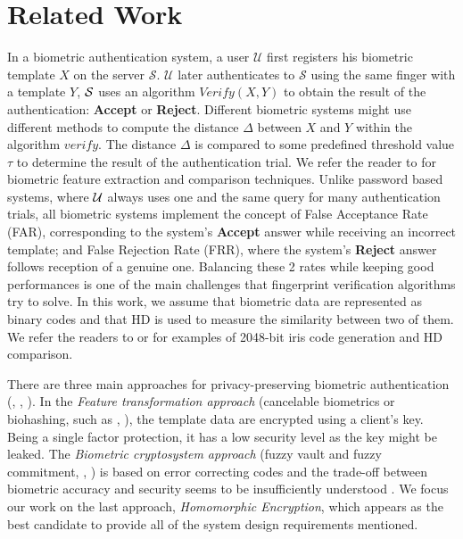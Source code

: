 \section{Related Work}
\label{sec:iscRelatedWor}
In a biometric authentication system, a user $\mathcal{U}$ first registers his
biometric template $X$ on the server $\mathcal{S}$. $\mathcal{U}$ later
authenticates to $\mathcal{S}$ using the same finger with a template $Y$,
$\mathcal{S}$ uses an algorithm $Verify(X,Y)$ to obtain the result of the
authentication: \textbf{Accept} or \textbf{Reject}. Different biometric systems
might use different methods to compute the distance $\Delta$ between $X$ and $Y$
within the algorithm $verify$. The distance $\Delta$ is compared to some
predefined threshold value $\tau$ to determine the result of the authentication
trial. We refer the reader to \cite{jain2007handbook} for biometric feature
extraction and comparison techniques. Unlike password based systems, where
$\mathcal{U}$ always uses one and the same query for many authentication trials,
all biometric systems implement the concept of False Acceptance Rate (FAR),
corresponding to the system's \textbf{Accept} answer while receiving an
incorrect template; and False Rejection Rate (FRR), where the system's
\textbf{Reject} answer follows reception of a genuine one.  Balancing these 2
rates while keeping good performances is one of the main challenges that
fingerprint verification algorithms \cite{FVConGoi2:online} try to solve. In
this work, we assume that biometric data are represented as binary codes and
that HD is used to measure the similarity between two of them. We refer the
readers to \cite{daugman2003importance} or \cite{FujitsuD7:online} for examples
of 2048-bit iris code generation and HD comparison.

There are three main approaches for privacy-preserving biometric authentication
(\cite{jain201650}, \cite{belguechi2011overview}, \cite{jain2008biometric}). In
the \emph{Feature transformation approach} (cancelable biometrics or biohashing,
such as \cite{teoh2008cancellable}, \cite{cappelli2010minutia}), the template
data are encrypted using a client's key. Being a single factor protection, it
has a low security level as the key might be leaked. The \emph{Biometric
  cryptosystem approach} (fuzzy vault and fuzzy commitment,
\cite{uludag2004biometric}, \cite{nagar2010hybrid}) is based on error correcting
codes and the trade-off between biometric accuracy and security seems to be
insufficiently understood . We focus our work on the last approach,
\emph{Homomorphic Encryption}, which appears as the best candidate to provide
all of the system design requirements mentioned.

